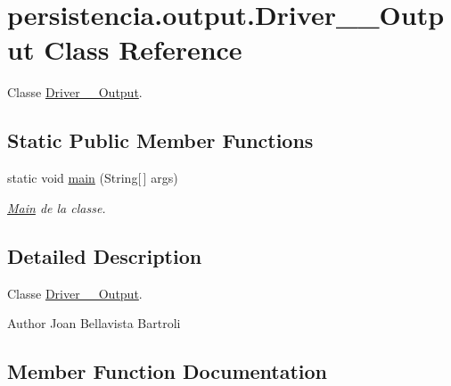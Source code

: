\hypertarget{classpersistencia_1_1output_1_1Driver____Output}{}\section{persistencia.\+output.\+Driver\+\_\+\+\_\+\+Output Class Reference}
\label{classpersistencia_1_1output_1_1Driver____Output}


Classe \hyperlink{classpersistencia_1_1output_1_1Driver____Output}{Driver\+\_\+\+\_\+\+Output}.  


\subsection*{Static Public Member Functions}
\begin{DoxyCompactItemize}
\item 
static void \hyperlink{classpersistencia_1_1output_1_1Driver____Output_a1fcfdd813a7c5460772e74b5709fc030}{main} (String\mbox{[}$\,$\mbox{]} args)
\begin{DoxyCompactList}\small\item\em \hyperlink{classMain}{Main} de la classe. \end{DoxyCompactList}\end{DoxyCompactItemize}


\subsection{Detailed Description}
Classe \hyperlink{classpersistencia_1_1output_1_1Driver____Output}{Driver\+\_\+\+\_\+\+Output}. 

\begin{DoxyAuthor}{Author}
Joan Bellavista Bartroli 
\end{DoxyAuthor}


\subsection{Member Function Documentation}
\mbox{\label{classpersistencia_1_1output_1_1Driver____Output_a1fcfdd813a7c5460772e74b5709fc030}} 
